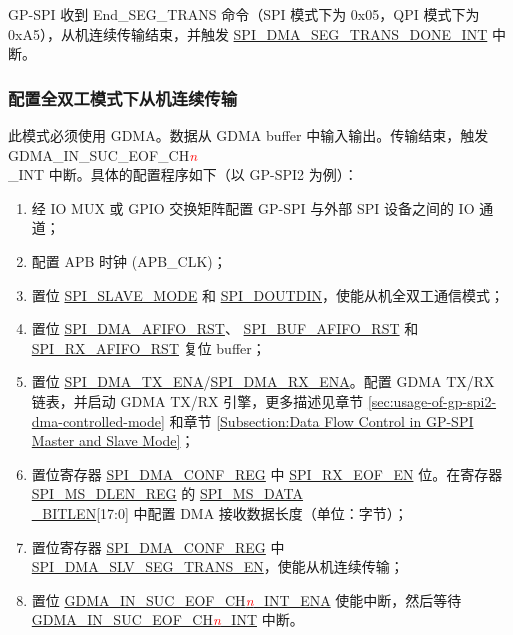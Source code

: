 \documentclass[main\_\_CN.tex]{subfiles}
\begin{document}
GP-SPI 收到 End\_SEG\_TRANS 命令（SPI 模式下为 0x{}05，QPI 模式下为 0x{}A5），从机连续传输结束，并触发 \hyperref[int:SPIDMASEGTRANSDONEINT]{ SPI\_DMA\_SEG\_TRANS\_DONE\_INT} 中断。

\subsubsection{配置全双工模式下从机连续传输}\label{sec:gp-spi2-slave-fd-seg-trans}
此模式必须使用 GDMA。数据从 GDMA buffer 中输入输出。传输结束，触发 GDMA\_IN\_SUC\_EOF\_CH\textcolor{red}{\it{n}}\\\_INT  中断。具体的配置程序如下（以 GP-SPI2 为例）：

\begin{enumerate}
   \item 经 IO MUX 或 GPIO 交换矩阵配置 GP-SPI 与外部 SPI 设备之间的 IO 通道；
   \item 配置 APB 时钟 (APB\_CLK)；

    \item 置位  \hyperref[fielddesc:SPISLAVEMODE]{SPI\_SLAVE\_MODE} 和  \hyperref[fielddesc:SPIDOUTDIN]{SPI\_DOUTDIN}，使能从机全双工通信模式；

    \item 置位  \hyperref[fielddesc:SPIDMAAFIFORST]{SPI\_DMA\_AFIFO\_RST}、 \hyperref[fielddesc:SPIBUFAFIFORST]{SPI\_BUF\_AFIFO\_RST} 和  \hyperref[fielddesc:SPIRXAFIFORST]{SPI\_RX\_AFIFO\_RST} 复位 buffer；

    \item 置位  \hyperref[fielddesc:SPIDMATXENA]{SPI\_DMA\_TX\_ENA}/\hyperref[fielddesc:SPIDMARXENA]{SPI\_DMA\_RX\_ENA}。配置 GDMA TX/RX 链表，并启动 GDMA TX/RX 引擎，更多描述见章节  \ref{sec:usage-of-gp-spi2-dma-controlled-mode} 和章节  \ref{Subsection:Data Flow Control in GP-SPI Master and Slave Mode}；

    \item 置位寄存器  \hyperref[regdesc:SPIDMACONFREG]{SPI\_DMA\_CONF\_REG} 中  \hyperref[fielddesc:SPIRXEOFEN]{SPI\_RX\_EOF\_EN} 位。在寄存器  \hyperref[regdesc:SPIMSDLENREG]{SPI\_MS\_DLEN\_REG} 的 \hyperref[fielddesc:SPIMSDATABITLEN]{SPI\_MS\_DATA\\\_BITLEN}[17:0] 中配置 DMA 接收数据长度（单位：字节）；

    \item 置位寄存器  \hyperref[regdesc:SPIDMACONFREG]{SPI\_DMA\_CONF\_REG} 中 \hyperref[fielddesc:SPIDMASLVSEGTRANSEN]{SPI\_DMA\_SLV\_SEG\_TRANS\_EN}，使能从机连续传输；

    \item 置位  \hyperref[fielddesc:DMAINSUCEOFCHNINTENA]{GDMA\_IN\_SUC\_EOF\_CH\textcolor{red}{\it{n}}\_INT\_ENA}  使能中断，然后等待  \hyperref[int:GDMAINSUCEOFINT]{GDMA\_IN\_SUC\_EOF\_CH\textcolor{red}{\it{n}}\_INT} 中断。
\end{enumerate}
\end{document}
